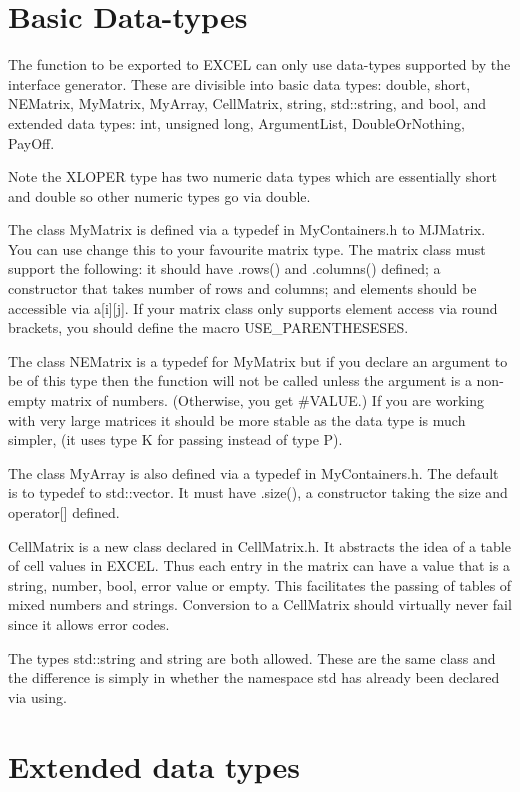 \documentclass[12pt,reqno]{amsart}
\numberwithin{equation}{section}
\numberwithin{figure}{section}
\begin{document}
\section{Basic Data-types}

The function to be exported to EXCEL can only use data-types supported
by the interface generator. These are divisible into basic data types: 
double, short, NEMatrix,
MyMatrix, MyArray, CellMatrix, string, std::string, and bool, and
extended data types: int, unsigned long, ArgumentList,
DoubleOrNothing, PayOff. 

Note the XLOPER type has two numeric data types which are essentially
short and double so other numeric types go via double. 

The class MyMatrix is defined via a typedef in MyContainers.h to
MJMatrix. You can use change this to your favourite matrix type. The
matrix class must support the following: it should have .rows()
and .columns() defined; a constructor that takes number of rows and
columns; and elements should be accessible via a[i][j]. If your matrix
class only supports element access via round brackets, you should
define the macro USE\_PARENTHESESES.

The class NEMatrix is a typedef for MyMatrix but if you declare an
argument to be of this type then the function will not be called
unless the argument is a non-empty matrix of numbers. (Otherwise, you
get \#VALUE.) If you are working with very large matrices it should be
more stable as the data type is much simpler, (it uses type K for
passing instead of type P). 

The class MyArray is also defined via a typedef in MyContainers.h. The
default is to typedef to std::vector. It must have .size(), a
constructor taking the size and operator[] defined. 

CellMatrix is a new class declared in CellMatrix.h. It abstracts the
idea of a table of cell values in EXCEL. Thus each entry in the matrix
can have a value that is a string, number, bool, error value or
empty. This facilitates the passing of tables of mixed numbers and
strings. Conversion to a CellMatrix should virtually never fail since
it allows error codes. 

The types std::string and string are both allowed. These are the same
class and the difference is simply in whether the namespace std has
already been declared via using. 

\section{Extended data types}
\end{document}
